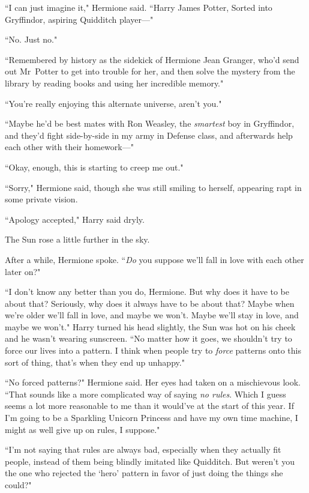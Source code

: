 ``I can just imagine it," Hermione said. ``Harry James Potter, Sorted into Gryffindor, aspiring Quidditch player—"

``No. Just no."

``Remembered by history as the sidekick of Hermione Jean Granger, who'd send out Mr~Potter to get into trouble for her, and then solve the mystery from the library by reading books and using her incredible memory."

``You're really enjoying this alternate universe, aren't you."

``Maybe he'd be best mates with Ron Weasley, the \emph{smartest} boy in Gryffindor, and they'd fight side-by-side in my army in Defense class, and afterwards help each other with their homework—"

``Okay, enough, this is starting to creep me out."

``Sorry," Hermione said, though she was still smiling to herself, appearing rapt in some private vision.

``Apology accepted," Harry said dryly.

The Sun rose a little further in the sky.

After a while, Hermione spoke. ``\emph{Do} you suppose we'll fall in love with each other later on?"

``I don't know any better than you do, Hermione. But why does it have to be about that? Seriously, why does it always have to be about that? Maybe when we're older we'll fall in love, and maybe we won't. Maybe we'll stay in love, and maybe we won't." Harry turned his head slightly, the Sun was hot on his cheek and he wasn't wearing sunscreen. ``No matter how it goes, we shouldn't try to force our lives into a pattern. I think when people try to \emph{force} patterns onto this sort of thing, that's when they end up unhappy."

``No forced patterns?" Hermione said. Her eyes had taken on a mischievous look. ``That sounds like a more complicated way of saying \emph{no rules}. Which I guess seems a lot more reasonable to me than it would've at the start of this year. If I'm going to be a Sparkling Unicorn Princess and have my own time machine, I might as well give up on rules, I suppose."

``I'm not saying that rules are always bad, especially when they actually fit people, instead of them being blindly imitated like Quidditch. But weren't you the one who rejected the `hero' pattern in favor of just doing the things she could?"

